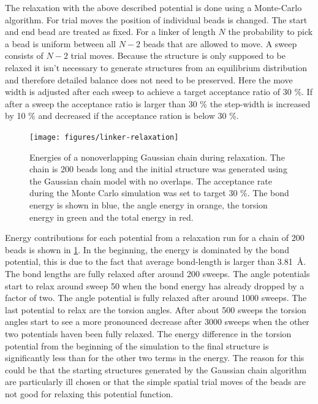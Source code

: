 \documentclass[12pt, twoside]{report}
\begin{document}
The relaxation with the above described potential is done using a Monte-Carlo
algorithm. For trial moves the position of individual beads is changed. The
start and end bead are treated as fixed. For a linker of length \(N\) the
probability to pick a bead is uniform between all \(N-2\) beads that are allowed
to move. A sweep consists of \(N-2\) trial moves. Because the structure is only
supposed to be relaxed it isn't necessary to generate structures from an
equilibrium distribution and therefore detailed balance does not need to be
preserved. Here the move width is adjusted after each sweep to achieve a target
acceptance ratio of 30 \%. If after a sweep the acceptance ratio is larger than
30 \% the step-width is increased by 10 \% and decreased if the acceptance
ration is below 30 \%.

\begin{figure}[!ht] \centering
\texttt{[image: figures/linker-relaxation]}
\caption[Monte-Carlo relaxation simulation of a Gaussian polymer
chain.]{Energies of a nonoverlapping Gaussian chain during relaxation. The chain
is 200 beads long and the initial structure was generated using the Gaussian
chain model with no overlaps. The acceptance rate during the Monte Carlo
simulation was set to target 30 \%. The bond energy is shown in blue, the angle
energy in orange, the torsion energy in green and the total energy in red.}
\label{fig:linker-relaxation}
\end{figure} Energy contributions for each potential from a relaxation run for a
chain of 200 beads is shown in \cref{fig:linker-relaxation}. In the beginning,
the energy is dominated by the bond potential, this is due to the fact that
average bond-length is larger than \SI{3.81}{\AA}. The bond lengths are fully
relaxed after around 200 sweeps. The angle potentials start to relax around
sweep 50 when the bond energy has already dropped by a factor of two. The angle
potential is fully relaxed after around 1000 sweeps. The last potential to relax
are the torsion angles. After about 500 sweeps the torsion angles start to see a
more pronounced decrease after 3000 sweeps when the other two potentials haven
been fully relaxed. The energy difference in the torsion potential from the
beginning of the simulation to the final structure is significantly less than
for the other two terms in the energy. The reason for this could be that the
starting structures generated by the Gaussian chain algorithm are particularly
ill chosen or that the simple spatial trial moves of the beads are not good for
relaxing this potential function.
\end{document}
